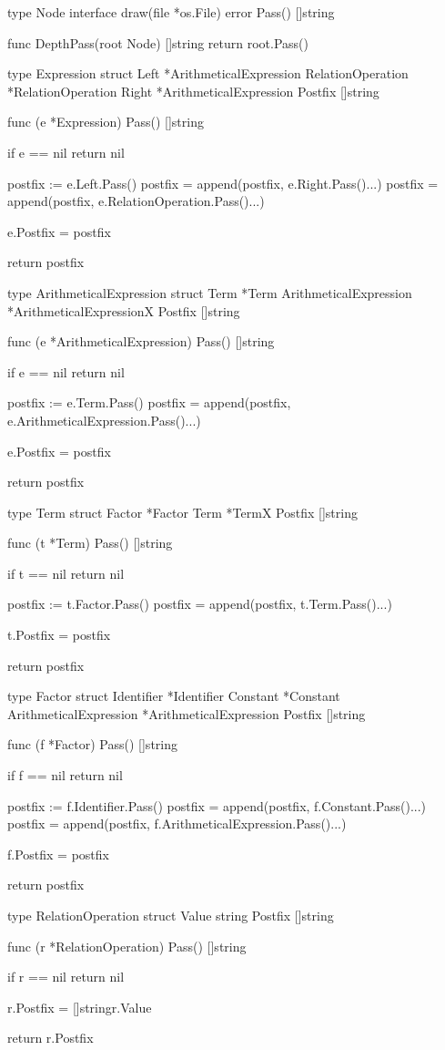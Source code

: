 type Node interface {
	draw(file *os.File) error
	Pass() []string
}

func DepthPass(root Node) []string {
	return root.Pass()
}

type Expression struct {
	Left              *ArithmeticalExpression
	RelationOperation *RelationOperation
	Right             *ArithmeticalExpression
	Postfix           []string
}

func (e *Expression) Pass() []string {
	if e == nil {
		return nil
	}

	postfix := e.Left.Pass()
	postfix = append(postfix, e.Right.Pass()...)
	postfix = append(postfix, e.RelationOperation.Pass()...)

	e.Postfix = postfix

	return postfix
}

type ArithmeticalExpression struct {
	Term                   *Term
	ArithmeticalExpression *ArithmeticalExpressionX
	Postfix                []string
}

func (e *ArithmeticalExpression) Pass() []string {
	if e == nil {
		return nil
	}

	postfix := e.Term.Pass()
	postfix = append(postfix, e.ArithmeticalExpression.Pass()...)

	e.Postfix = postfix

	return postfix
}

type Term struct {
	Factor  *Factor
	Term    *TermX
	Postfix []string
}

func (t *Term) Pass() []string {
	if t == nil {
		return nil
	}

	postfix := t.Factor.Pass()
	postfix = append(postfix, t.Term.Pass()...)

	t.Postfix = postfix

	return postfix
}

type Factor struct {
	Identifier             *Identifier
	Constant               *Constant
	ArithmeticalExpression *ArithmeticalExpression
	Postfix                []string
}

func (f *Factor) Pass() []string {
	if f == nil {
		return nil
	}

	postfix := f.Identifier.Pass()
	postfix = append(postfix, f.Constant.Pass()...)
	postfix = append(postfix, f.ArithmeticalExpression.Pass()...)

	f.Postfix = postfix

	return postfix
}

type RelationOperation struct {
	Value   string
	Postfix []string
}

func (r *RelationOperation) Pass() []string {
	if r == nil {
		return nil
	}

	r.Postfix = []string{r.Value}

	return r.Postfix
}

